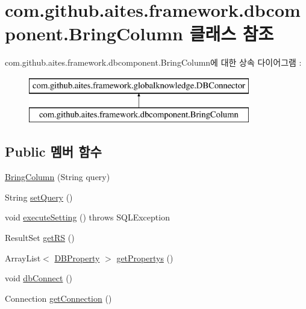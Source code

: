 \hypertarget{classcom_1_1github_1_1aites_1_1framework_1_1dbcomponent_1_1_bring_column}{}\section{com.\+github.\+aites.\+framework.\+dbcomponent.\+Bring\+Column 클래스 참조}
\label{classcom_1_1github_1_1aites_1_1framework_1_1dbcomponent_1_1_bring_column}
com.\+github.\+aites.\+framework.\+dbcomponent.\+Bring\+Column에 대한 상속 다이어그램 \+: \begin{figure}[H]
\begin{center}
\leavevmode
\includegraphics[height=2.000000cm]{classcom_1_1github_1_1aites_1_1framework_1_1dbcomponent_1_1_bring_column}
\end{center}
\end{figure}
\subsection*{Public 멤버 함수}
\begin{DoxyCompactItemize}
\item 
\mbox{\hyperlink{classcom_1_1github_1_1aites_1_1framework_1_1dbcomponent_1_1_bring_column_a603ecee3a519d940bcde4a5607f72c3a}{Bring\+Column}} (String query)
\item 
String \mbox{\hyperlink{classcom_1_1github_1_1aites_1_1framework_1_1dbcomponent_1_1_bring_column_a7003115d5bf60686b6bb06ae600b5f5a}{set\+Query}} ()
\item 
void \mbox{\hyperlink{classcom_1_1github_1_1aites_1_1framework_1_1dbcomponent_1_1_bring_column_ad0341d134464e936ffcbc6c70f3c2f53}{execute\+Setting}} ()  throws S\+Q\+L\+Exception 
\item 
Result\+Set \mbox{\hyperlink{classcom_1_1github_1_1aites_1_1framework_1_1dbcomponent_1_1_bring_column_ada5f3bc1e66d57b51a6a936cf7b6c6d9}{get\+RS}} ()
\item 
Array\+List$<$ \mbox{\hyperlink{classcom_1_1github_1_1aites_1_1framework_1_1dbcomponent_1_1_d_b_property}{D\+B\+Property}} $>$ \mbox{\hyperlink{classcom_1_1github_1_1aites_1_1framework_1_1dbcomponent_1_1_bring_column_a058442165c11bf22ccd9d146fe9c4bd4}{get\+Propertys}} ()
\item 
void \mbox{\hyperlink{classcom_1_1github_1_1aites_1_1framework_1_1globalknowledge_1_1_d_b_connector_a108808207e33b613b470855bb2be9223}{db\+Connect}} ()
\item 
Connection \mbox{\hyperlink{classcom_1_1github_1_1aites_1_1framework_1_1globalknowledge_1_1_d_b_connector_a94ff414cd6c3dcc402787d96136b5788}{get\+Connection}} ()
\end{DoxyCompactItemize}
